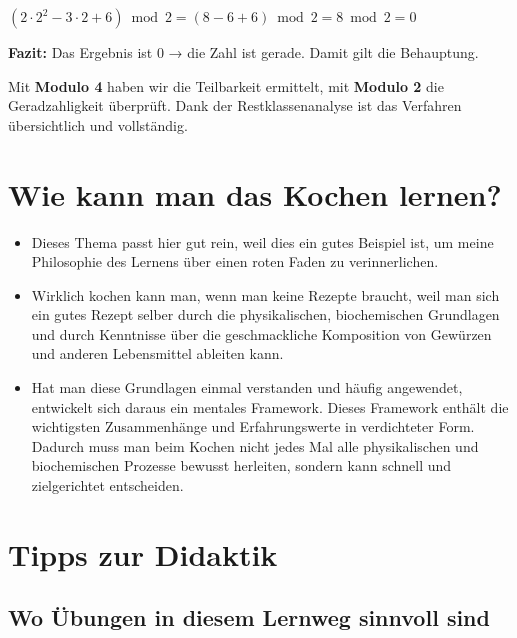 \documentclass{article}
\begin{document}
      
      $(2 \cdot 2^2 - 3 \cdot 2 + 6) \bmod 2 = (8 - 6 + 6) \bmod 2 = 8 \bmod 2 = 0$
      


      

        \textbf{Fazit:} Das Ergebnis ist 0 → die Zahl ist gerade. Damit gilt die Behauptung.
      


      

        Mit \textbf{Modulo 4} haben wir die Teilbarkeit ermittelt, mit \textbf{Modulo 2} die Geradzahligkeit überprüft. Dank der Restklassenanalyse ist das Verfahren übersichtlich und vollständig.


        \section{Wie kann man das Kochen lernen?}
      
        \begin{itemize}
          \item Dieses Thema passt hier gut rein, weil dies ein gutes Beispiel ist, um meine Philosophie des Lernens über einen roten Faden zu verinnerlichen.

          \item Wirklich kochen kann man, wenn man keine Rezepte braucht, weil man sich ein gutes Rezept selber durch die physikalischen, biochemischen Grundlagen und durch Kenntnisse über die geschmackliche Komposition von Gewürzen und anderen Lebensmittel ableiten kann.

          \item Hat man diese Grundlagen einmal verstanden und häufig angewendet, entwickelt sich daraus ein mentales Framework. Dieses Framework enthält die wichtigsten Zusammenhänge und Erfahrungswerte in verdichteter Form. Dadurch muss man beim Kochen nicht jedes Mal alle physikalischen und biochemischen Prozesse bewusst herleiten, sondern kann schnell und zielgerichtet entscheiden.

        \end{itemize}
      
    
      
        \section{Tipps zur Didaktik}

        \subsection{Wo Übungen in diesem Lernweg sinnvoll sind}
\end{document}
